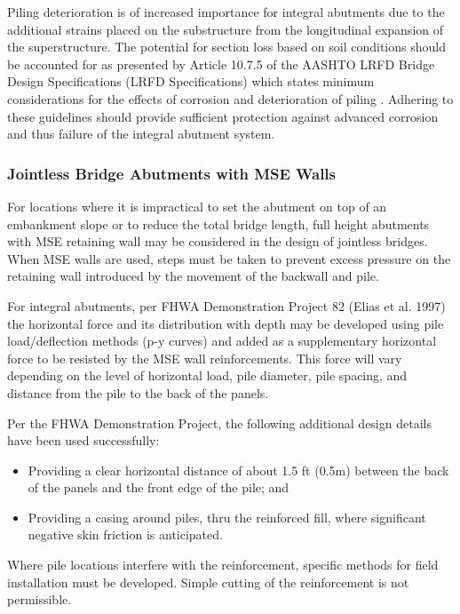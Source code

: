 Piling deterioration is of increased importance for integral abutments due to the additional strains placed on the
substructure from the longitudinal expansion of the superstructure. The potential for section loss based on soil
conditions should be accounted for as presented by Article 10.7.5 of the AASHTO LRFD Bridge Design Specifications
(LRFD Specifications) which states minimum considerations for the effects of corrosion and deterioration of piling \cite{aashto2012l}. Adhering to these guidelines should provide sufficient protection against advanced corrosion and
thus failure of the integral abutment system.

\subsubsection{Jointless Bridge Abutments with MSE Walls}
For locations where it is impractical to set the abutment on top of an embankment slope or to reduce the total
bridge length, full height abutments with MSE retaining wall may be considered in the design of jointless bridges. When MSE walls are used, steps must be taken to prevent excess pressure on the retaining wall introduced by the
movement of the backwall and pile.

For integral abutments, per FHWA Demonstration Project 82 (Elias et al. 1997) the horizontal force and its
distribution with depth may be developed using pile load/deflection methods (p-y curves) and added as a
supplementary horizontal force to be resisted by the MSE wall reinforcements. This force will vary depending on the
level of horizontal load, pile diameter, pile spacing, and distance from the pile to the back of the panels.

Per the FHWA Demonstration Project, the following additional design details have been used successfully:

\begin{itemize}
  \item Providing a clear horizontal distance of about 1.5 ft (0.5m) between the back of the panels and the front edge of the pile; and
  \item Providing a casing around piles, thru the reinforced fill, where significant negative skin friction is anticipated.
\end{itemize}

Where pile locations interfere with the reinforcement, specific methods for field installation must be developed. Simple cutting of the reinforcement is not permissible.

